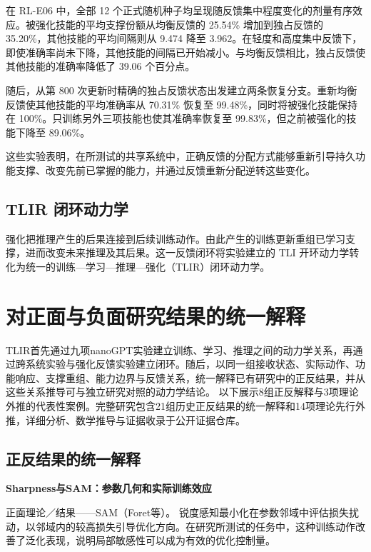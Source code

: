 在 RL-E06 中，全部 12 个正式随机种子均呈现随反馈集中程度变化的剂量有序效应。被强化技能的平均支撑份额从均衡反馈的 25.54\% 增加到独占反馈的 35.20\%，其他技能的平均间隔则从 9.474 降至 3.962。在轻度和高度集中反馈下，即使准确率尚未下降，其他技能的间隔已开始减小。与均衡反馈相比，独占反馈使其他技能的准确率降低了 39.06 个百分点。

随后，从第 800 次更新时精确的独占反馈状态出发建立两条恢复分支。重新均衡反馈使其他技能的平均准确率从 70.31\% 恢复至 99.48\%，同时将被强化技能保持在 100\%。只训练另外三项技能也使其准确率恢复至 99.83\%，但之前被强化的技能下降至 89.06\%。

这些实验表明，在所测试的共享系统中，正确反馈的分配方式能够重新引导持久功能支撑、改变先前已掌握的能力，并通过反馈重新分配逆转这些变化。

\subsection{TLIR 闭环动力学}

强化把推理产生的后果连接到后续训练动作。由此产生的训练更新重组已学习支撑，进而改变未来推理及其后果。这一反馈闭环将实验建立的 TLI 开环动力学转化为统一的训练—学习—推理—强化（TLIR）闭环动力学。

\section{对正面与负面研究结果的统一解释}
\label{sec:unified}

TLIR首先通过九项nanoGPT实验建立训练、学习、推理之间的动力学关系，再通过跨系统实验与强化反馈实验建立闭环。随后，以同一组接收状态、实际动作、功能响应、支撑重组、能力边界与反馈关系，统一解释已有研究中的正反结果，并从这些关系推导可与独立研究对照的动力学结论。 以下展示8组正反解释与3项理论外推的代表性案例。完整研究包含21组历史正反结果的统一解释和14项理论先行外推，详细分析、数学推导与证据收录于公开证据仓库。

\subsection{正反结果的统一解释}

\noindent\textbf{Sharpness与SAM：参数几何和实际训练效应}\par

正面理论／结果——SAM（Foret等）。 \cite{foret2021} 锐度感知最小化在参数邻域中评估损失扰动，以邻域内的较高损失引导优化方向。在研究所测试的任务中，这种训练动作改善了泛化表现，说明局部敏感性可以成为有效的优化控制量。

